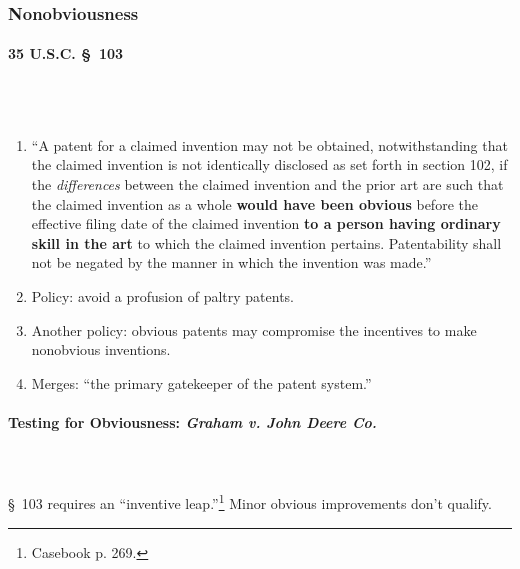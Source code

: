 \subsubsection{Nonobviousness}

\paragraph{35 U.S.C. \S\ 103}
~\\\\
\begin{enumerate}
    \item ``A patent for a claimed invention may not be obtained, 
    notwithstanding that the claimed invention is not identically disclosed as 
    set forth in section 102, if the \emph{differences} between the claimed 
    invention and the prior art are such that the claimed invention as a whole 
    \textbf{would have been obvious} before the effective filing date of the 
    claimed invention \textbf{to a person having ordinary skill in the art} to 
    which the claimed invention pertains. Patentability shall not be negated 
    by the manner in which the invention was made.''
    \item Policy: avoid a profusion of paltry patents.
    \item Another policy: obvious patents may compromise the incentives to 
    make nonobvious inventions.
    \item Merges: ``the primary gatekeeper of the patent system.''
\end{enumerate}

\paragraph{Testing for Obviousness: \emph{Graham v. John Deere Co.}}
~\\\\
\S\ 103 requires an ``inventive leap.''\footnote{Casebook p. 269.} Minor obvious 
improvements don't qualify.

